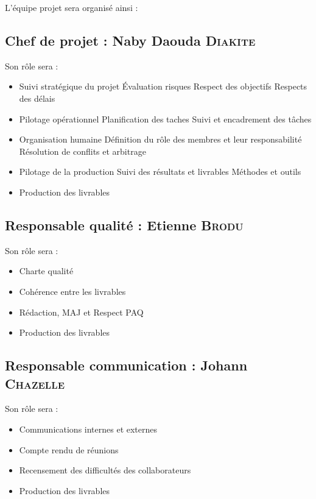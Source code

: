 L’équipe projet sera organisé ainsi :
\subsection{Chef de projet : Naby Daouda \textsc{Diakite}}

Son rôle sera :
\begin{itemize}
    \item Suivi stratégique du projet
        \subitem Évaluation risques
        \subitem Respect des objectifs
        \subitem Respects des délais
    \item Pilotage opérationnel
        \subitem Planification des taches
        \subitem Suivi et encadrement des tâches
    \item Organisation humaine
        \subitem Définition du rôle des membres et leur responsabilité
        \subitem Résolution de conflits et arbitrage
    \item Pilotage de la production
        \subitem Suivi des résultats et livrables
        \subitem Méthodes et outils
    \item Production des livrables
\end{itemize}

\subsection{Responsable qualité : Etienne \textsc{Brodu}}

Son rôle sera :
\begin{itemize}
    \item Charte qualité
    \item Cohérence entre les livrables
    \item Rédaction, MAJ  et Respect PAQ
    \item Production des livrables
\end{itemize}

\subsection{Responsable communication : Johann \textsc{Chazelle}}

Son rôle sera :
\begin{itemize}
    \item Communications internes et externes
    \item Compte rendu de réunions
    \item Recensement des difficultés des collaborateurs
    \item Production des livrables
\end{itemize}

